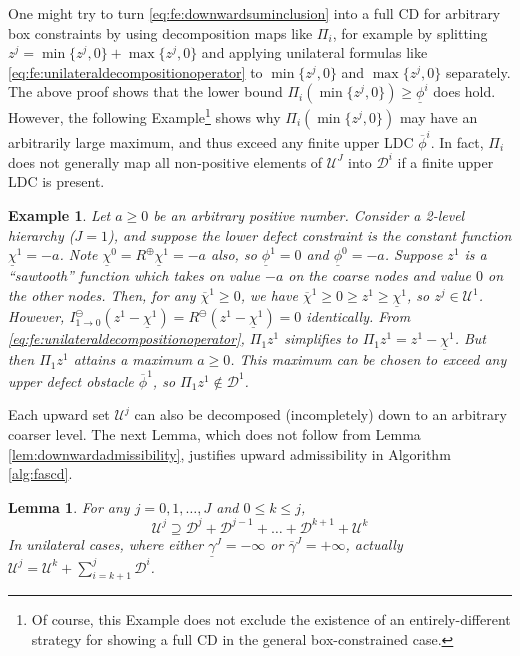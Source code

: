 \documentclass[letterpaper,final,12pt,reqno]{amsart}
\theoremstyle{cstyle}
\newtheorem{lemma}[theorem]{Lemma}
\theoremstyle{cstyle*}
\theoremstyle{dstyle}
\newtheorem{example}[theorem]{Example}
\numberwithin{equation}{section}
\numberwithin{figure}{section}
\numberwithin{table}{section}
\numberwithin{theorem}{section}
\newcommand{\maxR}{R^{\bm{\oplus}}}
\newcommand{\minR}{R^{\bm{\ominus}}}
\begin{document}
One might try to turn \eqref{eq:fe:downwardsuminclusion} into a full CD for arbitrary box constraints by using decomposition maps like $\Pi_i$, for example by splitting $z^j = \min\{z^j,0\} + \max\{z^j,0\}$ and applying unilateral formulas like \eqref{eq:fe:unilateraldecompositionoperator} to $\min\{z^j,0\}$ and $\max\{z^j,0\}$ separately.  The above proof shows that the lower bound $\Pi_i (\min\{z^j,0\}) \ge \underline{\phi}^i$ does hold.  However, the following Example\footnote{Of course, this Example does not exclude the existence of an entirely-different strategy for showing a full CD in the general box-constrained case.} shows why $\Pi_i(\min\{z^j,0\})$ may have an arbitrarily large maximum, and thus exceed any finite upper LDC $\overline{\phi}^i$.  In fact, $\Pi_i$ does not generally map all non-positive elements of $\mathcal{U}^J$ into $\mathcal{D}^i$ if a finite upper LDC is present.

\begin{example}  \label{ex:notfullcd}
Let $a\ge 0$ be an arbitrary positive number.  Consider a 2-level hierarchy ($J=1$), and suppose the lower defect constraint is the constant function $\underline{\chi}^1=-a$.  Note $\underline{\chi}^0=\maxR \underline{\chi}^1=-a$ also, so $\underline{\phi}^1=0$ and $\underline{\phi}^0=-a$.  Suppose $z^1$ is a ``sawtooth'' function which takes on value $-a$ on the coarse nodes and value $0$ on the other nodes.  Then, for any $\overline{\chi}^1\ge 0$, we have $\overline{\chi}^1 \ge 0 \ge z^1\ge \underline{\chi}^1$, so $z^j \in \mathcal{U}^1$.  However, $I_{1\to 0}^\ominus(z^1 - \underline{\chi}^1) = \minR(z^1 - \underline{\chi}^1) = 0$ identically.  From \eqref{eq:fe:unilateraldecompositionoperator}, $\Pi_1 z^1$ simplifies to $\Pi_1 z^1 = z^1 - \underline{\chi}^1$.  But then $\Pi_1 z^1$ attains a maximum $a\ge 0$.  This maximum can be chosen to exceed any upper defect obstacle $\overline{\phi}^1$, so $\Pi_1 z^1 \notin \mathcal{D}^1$.
\end{example}

Each upward set $\mathcal{U}^j$ can also be decomposed (incompletely) down to an arbitrary coarser level.  The next Lemma, which does not follow from Lemma \ref{lem:downwardadmissibility}, justifies upward admissibility in Algorithm \ref{alg:fascd}.

\begin{lemma}  \label{lem:upwardadmissibility}  For any $j=0,1,\dots,J$ and $0\le k\le j$,
\begin{equation}
\mathcal{U}^j \supseteq \mathcal{D}^j + \mathcal{D}^{j-1} + \dots + \mathcal{D}^{k+1} + \mathcal{U}^k \label{eq:fe:upwardsuminclusion}
\end{equation}
In unilateral cases, where either $\underline{\gamma}^J=-\infty$ or $\overline{\gamma}^J=+\infty$, actually $\mathcal{U}^j = \mathcal{U}^k + \sum_{i=k+1}^j \mathcal{D}^i$. \end{lemma}
\end{document}
